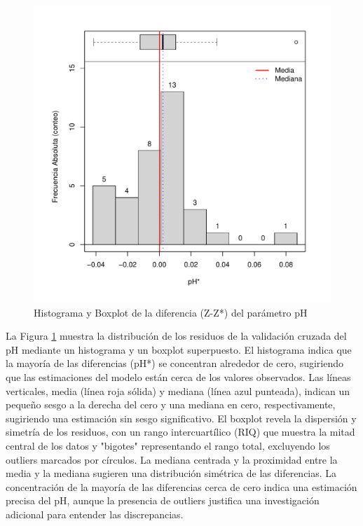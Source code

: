\begin{figure}[!htb]
    \centering
    \includegraphics[width=0.75\linewidth]{Figuras_AED/VARIOGRAFICO/pH-pH+_HistBoxPlot1.pdf}
    \caption{Histograma y Boxplot de la diferencia (Z-Z*) del parámetro pH}
    \label{fig:enter-label232}
\end{figure}


La Figura \ref{fig:enter-label232} muestra la distribución de los residuos de la validación cruzada del pH mediante un histograma y un boxplot superpuesto. El histograma indica que la mayoría de las diferencias (pH*) se concentran alrededor de cero, sugiriendo que las estimaciones del modelo están cerca de los valores observados. Las líneas verticales, media (línea roja sólida) y mediana (línea azul punteada), indican un pequeño sesgo a la derecha del cero y una mediana en cero, respectivamente, sugiriendo una estimación sin sesgo significativo. El boxplot revela la dispersión y simetría de los residuos, con un rango intercuartílico (RIQ) que muestra la mitad central de los datos y "bigotes" representando el rango total, excluyendo los outliers marcados por círculos. La mediana centrada y la proximidad entre la media y la mediana sugieren una distribución simétrica de las diferencias. La concentración de la mayoría de las diferencias cerca de cero indica una estimación precisa del pH, aunque la presencia de outliers justifica una investigación adicional para entender las discrepancias.



